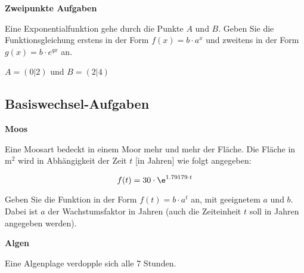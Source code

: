 \platzFuerBerechnungenBisEndeSeite{}



\bbwActAufgabenNr{} \textbf{Zweipunkte Aufgaben}

Eine Exponentialfunktion gehe durch die Punkte $A$ und $B$. Geben Sie
die Funktionsgleichung erstens in der Form $f(x)=b\cdot{} a^x$ und
zweitens in der Form $g(x)=b\cdot{} e^{qx}$ an.

\begin{bbwAufgabenBlock}
\item $A=(0|2)$ und $B=(2|4)$
\end{bbwAufgabenBlock}


\platzFuerBerechnungenBisEndeSeite{}




\subsection{Basiswechsel-Aufgaben}


\bbwActAufgabenNr{} \textbf{Moos}

Eine Moosart bedeckt in einem Moor mehr und mehr der Fläche. Die
Fläche in $\text{m}^2$ wird in Abhängigkeit der Zeit $t$ [in Jahren]
wie folgt angegeben:

$$f(t) = 30\cdot{}\e^{1.79179\cdot{}t} $$

\begin{bbwAufgabenBlock}

\item Geben Sie die Funktion in der Form $f(t) = b\cdot{}a^t$ an, mit
  geeignetem $a$ und $b$. Dabei ist $a$ der Wachstumsfaktor in Jahren
  (auch die Zeiteinheit $t$ soll in Jahren angegeben werden).

\end{bbwAufgabenBlock}
\TNTeop{}

\newpage

\bbwActAufgabenNr{} \textbf{Algen}

Eine Algenplage verdopple sich alle 7 Stunden.

